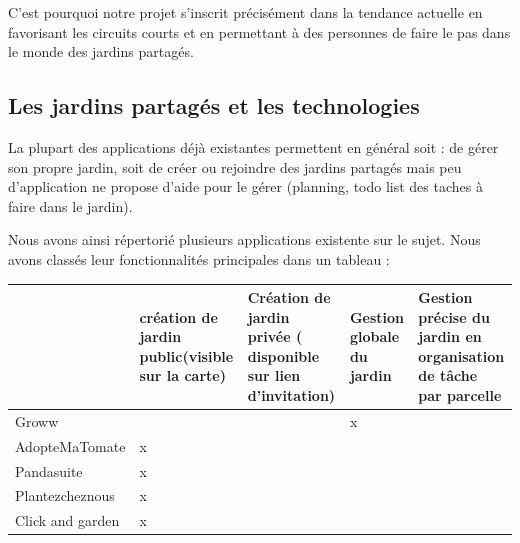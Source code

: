 \documentclass[french,a4paper]{article}
\begin{document}
C’est pourquoi notre projet s’inscrit précisément dans la tendance actuelle en favorisant les circuits courts et en permettant à des personnes de faire le pas dans le monde des jardins partagés.
\subsection{Les jardins partagés et les technologies}
La plupart des applications déjà existantes permettent en général soit : de gérer son propre jardin, soit de créer ou rejoindre des jardins partagés mais peu d’application ne propose d’aide pour le gérer (planning, todo list des taches à faire dans le jardin).

Nous avons ainsi répertorié plusieurs applications existente sur le sujet. Nous avons classés leur fonctionnalités principales dans un tableau :

\begin{center}
    \begin{tabular}{ |l| p{3cm} | p{3cm} | p{3cm} | p{3cm} | }
        \hline
                         & \raggedright création de jardin public(visible sur la carte) & \raggedright Création de jardin privée ( disponible sur lien d’invitation) & \raggedright Gestion globale du jardin & Gestion précise du jardin en organisation de tâche par parcelle \\
        \hline
        Groww            &                                                              &                                                                            & x                                      &                                                                 \\
        \hline
        AdopteMaTomate   & x                                                            &                                                                            &                                        &                                                                 \\
        \hline
        Pandasuite       & x                                                            &                                                                            &                                        &                                                                 \\
        \hline
        Plantezcheznous  & x                                                            &                                                                            &                                        &                                                                 \\
        \hline
        Click and garden & x                                                            &                                                                            &                                        &                                                                 \\

        \hline
    \end{tabular}
\end{center}
\end{document}
